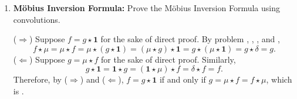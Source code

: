 \begin{enumerate}
\begin{enumerate}
    \item \textbf{Möbius Inversion Formula:} Prove the Möbius Inversion Formula using convolutions.\newline
    [Hint: Theorem 3.5 can be restated as $f=g \star \mathbf{1}$ if and only if $g=\mu \star f=f \star \mu$.]
    \begin{subprove}
      ($\Rightarrow$) Suppose $f = g \star \mathbf{1}$ for the sake of direct proof. 
      By problem , , , and ,
      \[
      f \star \mu = \mu \star f = \mu \star (g \star \mathbf{1}) = (\mu \star g) \star \mathbf{1} = g \star (\mu \star \mathbf{1}) = g \star \delta = g.
      \]
      ($\Leftarrow$) Suppose $g = \mu \star f$ for the sake of direct proof. Similarly,
      \[
      g \star \mathbf{1} = \mathbf{1} \star g = (\mathbf{1} \star \mu) \star f = \delta \star f = f.
      \]
      Therefore, by ($\Rightarrow$) and ($\Leftarrow$), $f = g \star \mathbf{1}$ if and only if $g = \mu \star f = f \star \mu$, which is .
    \end{subprove}
  \end{enumerate}

\end{enumerate}









